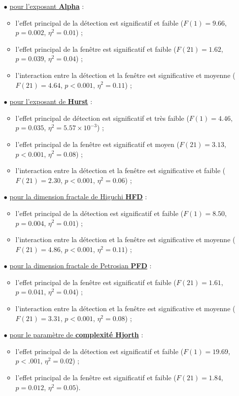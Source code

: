 \begin{itemize}
\item[$\bullet$] \underline{pour l'exposant \textbf{Alpha}} : 
\begin{itemize} 
\item l'effet principal de la détection est significatif et faible ($F(1)=9.66$, $p=0.002$, $\eta^2=0.01$) ; 
\item l'effet principal de la fenêtre est significatif et faible ($F(21)=1.62$, $p=0.039$, $\eta^2=0.04$) ;
\item l'interaction entre la détection et la fenêtre est significative et moyenne ($F(21)=4.64$, $p<0.001$, $\eta^2=0.11$) ; 
\end{itemize}
\item[$\bullet$] \underline{pour l'exposant de \textbf{Hurst}} : 
\begin{itemize} 
\item l'effet principal de détection est significatif et très faible ($F(1)=4.46$, $p=0.035$, $\eta^2=5.57\times10^{-3}$) ; 
\item l'effet principal de la fenêtre est significatif et moyen ($F(21)=3.13$, $p<0.001$, $\eta^2=0.08$) ;
\item l'interaction entre la détection et la fenêtre est significative et faible ($F(21)=2.30$, $p<0.001$, $\eta^2=0.06$) ; 
\end{itemize}
\item[$\bullet$] \underline{pour la dimension fractale de Higuchi \textbf{HFD}} : 
\begin{itemize} 
\item l'effet principal de la détection est significatif et faible ($F(1)=8.50$, $p=0.004$, $\eta^2=0.01$) ; 
\item l'interaction entre la détection et la fenêtre est significative et moyenne ($F(21)=4.86$, $p<0.001$, $\eta^2=0.11$) ;
\end{itemize}
\item[$\bullet$] \underline{pour la dimension fractale de Petrosian \textbf{PFD}} : 
\begin{itemize} 
\item l'effet principal de la fenêtre est significatif et faible ($F(21)=1.61$, $p=0.041$, $\eta^2=0.04$) ; 
\item l'interaction entre la détection et la fenêtre est significative et moyenne ($F(21)=3.31$, $p<0.001$, $\eta^2=0.08$) ;
\end{itemize}
\item[$\bullet$] \underline{pour le paramètre de \textbf{complexité Hjorth}} : 
\begin{itemize} 
\item l'effet principal de la détection est significatif et faible ($F(1)=19.69$, $p<.001$, $\eta^2=0.02$) ; 
\item l'effet principal de la fenêtre est significatif et faible ($F(21)=1.84$, $p=0.012$, $\eta^2=0.05$). \\
\end{itemize}
\end{itemize}


